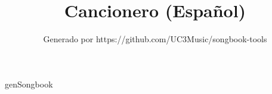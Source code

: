 \documentclass[11pt,a4paper,openany]{book}  %
\begin{document}
\Large

\title{Cancionero (Español)}
\author{Generado por https://github.com/UC3Music/songbook-tools} 

\maketitle
\cleardoublepage
\tableofcontents
\newpage  %


genSongbook

\printindex[song]
\end{document}

